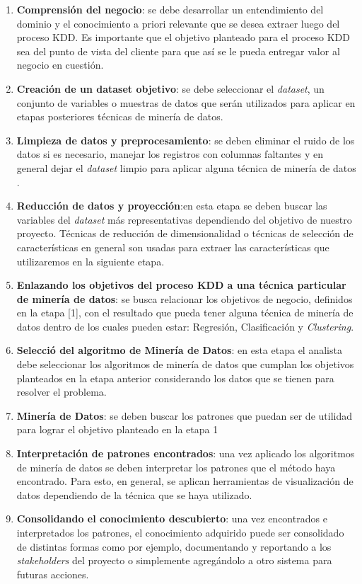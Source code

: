 \begin{enumerate}
    \item \textbf{Comprensión del negocio}: se debe desarrollar un entendimiento del dominio y el conocimiento a priori relevante que se desea extraer luego del proceso KDD. Es importante que el objetivo planteado para el proceso KDD sea del punto de vista del cliente para que así se le pueda entregar valor al negocio en cuestión. 
    \item \textbf{Creación de un dataset objetivo}: se debe seleccionar el \textit{dataset}, un conjunto de variables o muestras de datos que serán utilizados para aplicar en etapas posteriores técnicas de minería de datos.
    \item \textbf{Limpieza de datos y preprocesamiento}: se deben eliminar el ruido de los datos si es necesario, manejar los registros con columnas faltantes y en general dejar el \textit{dataset} limpio para aplicar alguna técnica de minería de datos .
    \item \textbf{Reducción de datos y proyección}:en esta etapa se deben buscar las variables del \textit{dataset} más representativas dependiendo del objetivo de nuestro proyecto. Técnicas de reducción de dimensionalidad o técnicas de selección de características en general son usadas para extraer las características que utilizaremos en la siguiente etapa.
    \item \textbf{Enlazando los objetivos del proceso KDD a una técnica particular de minería de datos}: se busca relacionar los objetivos de negocio, definidos en la etapa [1], con el resultado que pueda tener alguna técnica de minería de datos dentro de los cuales pueden estar: Regresión, Clasificación y \textit{Clustering}.
    \item \textbf{Selecció del algoritmo de Minería de Datos}: en esta etapa el analista debe seleccionar los algoritmos de minería de datos que cumplan los objetivos planteados en la etapa anterior considerando los datos que se tienen para resolver el problema. 
    \item \textbf{Minería de Datos}: se deben buscar los patrones que puedan ser de utilidad para lograr el objetivo planteado en la etapa 1 
    \item \textbf{Interpretación de patrones encontrados}: una vez aplicado los algoritmos de minería de datos se deben interpretar los patrones que el método haya encontrado. Para esto, en general, se aplican herramientas de visualización de datos dependiendo de la técnica que se haya utilizado.
    \item \textbf{Consolidando el conocimiento descubierto}: una vez encontrados e interpretados los patrones, el conocimiento adquirido puede ser consolidado de distintas formas como por ejemplo, documentando y reportando a los \textit{stakeholders} del proyecto o simplemente agregándolo a otro sistema para futuras acciones.
\end{enumerate}


